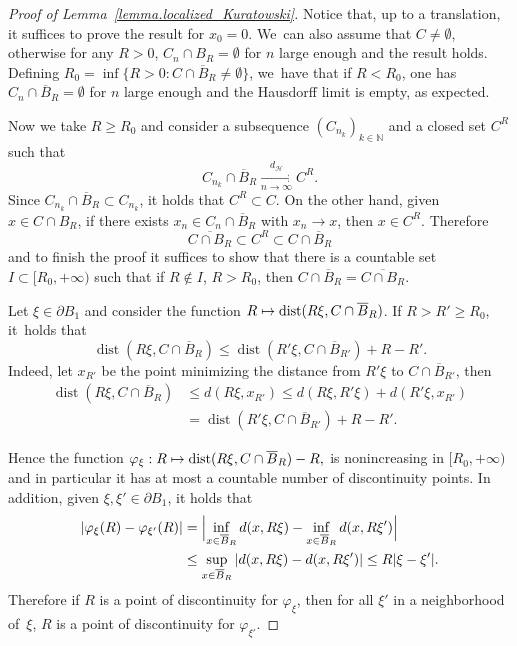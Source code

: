 \documentclass[JEP,XML,SOM,Unicode,NoFloatCountersInSection,published]{cedram}
\let\ts\textstyle
\newcommand\mto{\mathchoice{\longmapsto}{\mapsto}{\mapsto}{\mapsto}}
\theoremstyle{definition}
\DeclareMathOperator{\dist}{dist}
\newcommand{\distH}{d_{\mathcal{H}}}
\newcommand{\oB}{\overline{B}}
\begin{document}
\begin{proof}[Proof of Lemma~\ref{lemma.localized_Kuratowski}]
Notice that, up to a translation, it suffices to prove the result for $x_0 = 0$. We~can also assume that $C\neq\emptyset$, otherwise
for any $R>0$, $C_n\cap B_R=\emptyset$ for $n$ large enough and the result holds.
Defining $R_0=\inf\{R>0: C\cap \oB_R\neq\emptyset\}$, we~have that if $R<R_0$,
one has $C_n\cap \oB_{R}=\emptyset$ for $n$ large enough
and the Hausdorff limit is empty, as expected.

Now we take $R\ge R_0$ and consider a subsequence $\left(C_{n_k}\right)_{k \in \mathbb{N}}$ and a closed set $C^R$ such that
\[
C_{n_k}\cap \oB_R \xrightarrow[n \to \infty]{\ts\distH} C^R.
\]
Since $C_{n_k}\cap\oB_R\subset C_{n_k}$, it holds that $C^R\subset C$.
On the other hand, given $x\in C \cap B_R$, if there exists $x_n\in C_n \cap \oB_R$
with $x_n\to x$, then $x\in C^R$.
Therefore
\[
\overline{C\cap B_R}\subset C^R\subset C\cap\oB_R
\]
and to finish the proof it suffices to show that there is a countable set $I\subset [R_0,+\infty)$ such that
if $R\not\in I$, $R>R_0$, then $C\cap\oB_R =
\overline{C\cap B_R}$.

Let $\xi\in \partial B_1$ and consider the function
$R\mto \dist(R\xi,C\cap \oB_R)$. If $R>R'\ge R_0$, it~holds that
\[
\dist(R\xi,C\cap \oB_R)
\le \dist(R'\xi,C\cap \oB_{R'})+R-R'.
\]
Indeed, let $x_{R'}$ be the point minimizing the distance from $R'\xi$ to $C\cap \oB_{R'}$, then
\begin{align*}
\dist(R\xi, C\cap \oB_R)
&\le
d(R\xi, x_{R'})
\le
d(R\xi, R'\xi) + d(R'\xi, x_{R'}) \\
&=
\dist(R'\xi, C\cap \oB_{R'}) + R - R'.
\end{align*}

Hence the function
$
\varphi_\xi : R \mto \dist(R\xi,C\cap \oB_R)-R,
$
is nonincreasing in $[R_0,+\infty)$ and in particular it has at
most a countable number of discontinuity points. In addition, given $\xi,\xi'\in\partial B_1$, it holds that
\begin{align*}
\left|
\varphi_\xi(R) - \varphi_{\xi'}(R)
\right|
&=
\Bigl|
\inf_{x \in \oB_R} d(x, R\xi) - \inf_{x \in \oB_R} d(x, R\xi')
\Bigr|\\
&\le
\sup_{x \in \oB_R}
\left|
d(x, R\xi) - d(x, R\xi')
\right|
\le R|\xi - \xi'|.
\end{align*}
Therefore if $R$ is a point of discontinuity for $\varphi_\xi$, then
for all $\xi'$ in a neighborhood of~$\xi$, $R$ is a point
of discontinuity for $\varphi_{\xi'}$.


\end{proof}
\end{document}
